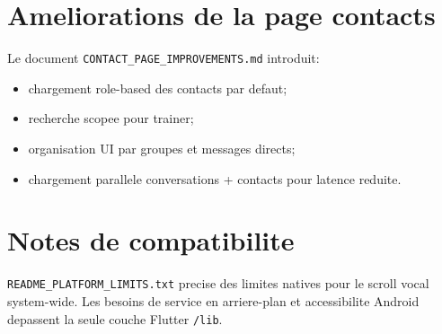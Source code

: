 \section{Ameliorations de la page contacts}

Le document \texttt{CONTACT\_PAGE\_IMPROVEMENTS.md} introduit:
\begin{itemize}[leftmargin=*]
  \item chargement role-based des contacts par defaut;
  \item recherche scopee pour trainer;
  \item organisation UI par groupes et messages directs;
  \item chargement parallele conversations + contacts pour latence reduite.
\end{itemize}

\section{Notes de compatibilite}

\texttt{README\_PLATFORM\_LIMITS.txt} precise des limites natives pour le scroll vocal system-wide. Les besoins de service en arriere-plan et accessibilite Android depassent la seule couche Flutter \texttt{/lib}.
